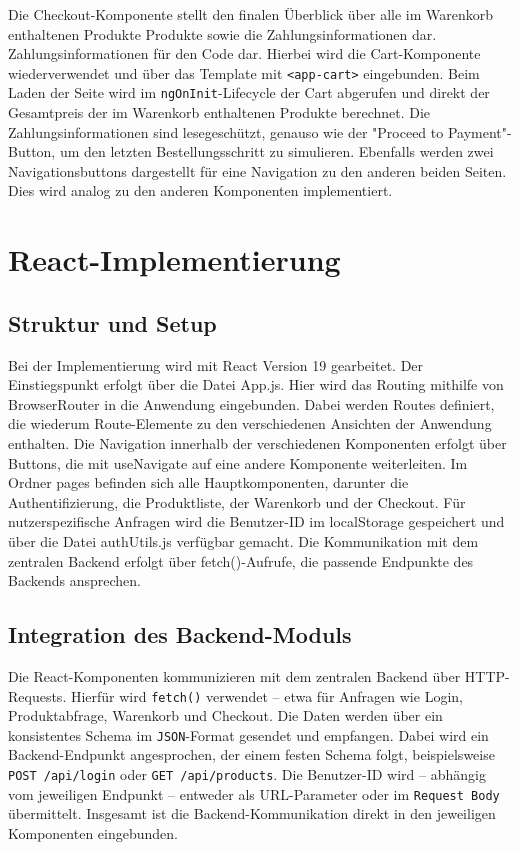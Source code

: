 \documentclass[oneside]{ausarbeitung}
\begin{document}
Die Checkout-Komponente stellt den finalen Überblick über alle im Warenkorb enthaltenen Produkte Produkte sowie die Zahlungsinformationen dar. Zahlungsinformationen für den Code dar. Hierbei wird die Cart-Komponente wiederverwendet und über das Template mit \texttt{<app-cart>} eingebunden.
Beim Laden der Seite wird im \texttt{ngOnInit}-Lifecycle der Cart abgerufen und direkt der Gesamtpreis der im Warenkorb enthaltenen Produkte berechnet. Die Zahlungsinformationen sind lesegeschützt, genauso wie der "Proceed to Payment"-Button, um den letzten Bestellungsschritt zu simulieren. Ebenfalls werden zwei Navigationsbuttons dargestellt für eine Navigation zu den anderen beiden Seiten. Dies wird analog zu den anderen Komponenten implementiert.

\section{React-Implementierung}
\subsection{Struktur und Setup}

Bei der Implementierung wird mit React Version 19 gearbeitet. Der Einstiegspunkt erfolgt über die Datei App.js. Hier wird das Routing mithilfe von BrowserRouter in die Anwendung eingebunden. Dabei werden Routes definiert, die wiederum Route-Elemente zu den verschiedenen Ansichten der Anwendung enthalten. Die Navigation innerhalb der verschiedenen Komponenten erfolgt über Buttons, die mit useNavigate auf eine andere Komponente weiterleiten. Im Ordner pages befinden sich alle Hauptkomponenten, darunter die Authentifizierung, die Produktliste, der Warenkorb und der Checkout. Für nutzerspezifische Anfragen wird die Benutzer-ID im localStorage gespeichert und über die Datei authUtils.js verfügbar gemacht. Die Kommunikation mit dem zentralen Backend erfolgt über fetch()-Aufrufe, die passende Endpunkte des Backends ansprechen.

\subsection{Integration des Backend-Moduls}

Die React-Komponenten kommunizieren mit dem zentralen Backend über HTTP-Requests. Hierfür wird \texttt{fetch()} verwendet – etwa für Anfragen wie Login, Produktabfrage, Warenkorb und Checkout. Die Daten werden über ein konsistentes Schema im \texttt{JSON}-Format gesendet und empfangen.
Dabei wird ein Backend-Endpunkt angesprochen, der einem festen Schema folgt, beispielsweise \texttt{POST /api/login} oder \texttt{GET /api/products}. Die Benutzer-ID wird – abhängig vom jeweiligen Endpunkt – entweder als URL-Parameter oder im \texttt{Request Body} übermittelt.
Insgesamt ist die Backend-Kommunikation direkt in den jeweiligen Komponenten eingebunden.
\end{document}
